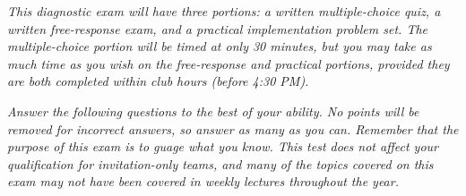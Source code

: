\documentclass[11pt,addpoints]{exam}
\begin{document}
\noindent
\textit{This diagnostic exam will have three portions: a written multiple-choice quiz, a written free-response exam, and a practical implementation problem set. The multiple-choice portion will be timed at only 30 minutes, but you may take as much time as you wish on the free-response and practical portions, provided they are both completed within club hours (before 4:30 PM).}

\noindent
\textit{Answer the following questions to the best of your ability. No points will be removed for incorrect answers, so answer as many as you can. Remember that the purpose of this exam is to guage what you know. This test does not affect your qualification for invitation-only teams, and many of the topics covered on this exam may not have been covered in weekly lectures throughout the year.}
\end{document}

